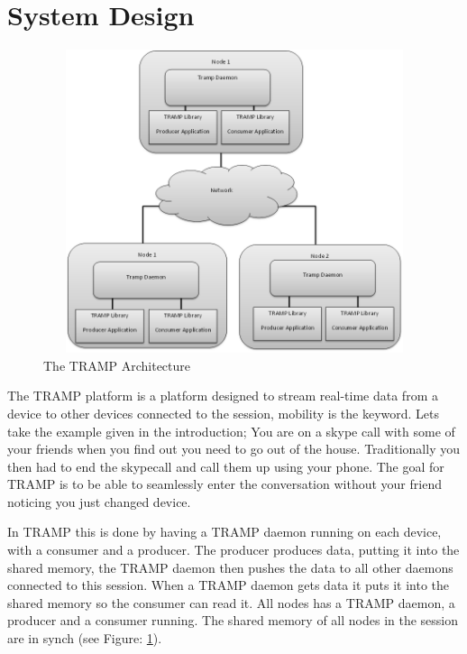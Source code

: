 \section{System Design}
\label{sec:design}

\begin{center}
\begin{figure}[ht!]
 \centering
 \includegraphics[width=6.0in, height=3.5in]{tramp_arch2.png}
\caption{The TRAMP Architecture}
\label{tramparc}
\end{figure}
\end{center}

The TRAMP platform is a platform designed to stream real-time data from a device to other devices connected to the session, mobility is the keyword. Lets take the example given in the introduction; You are on a skype call with some of your friends when you find out you need to go out of the house. Traditionally you then had to end the skypecall and call them up using your phone. The goal for TRAMP is to be able to seamlessly enter the conversation without your friend noticing you just changed device.

In TRAMP this is done by having a TRAMP daemon running on each device, with a consumer and a producer. The producer produces data, putting it into the shared memory, the TRAMP daemon then pushes the data to all other daemons connected to this session. When a TRAMP daemon gets data it puts it into the shared memory so the consumer can read it. All nodes has a TRAMP daemon, a producer and a consumer running. The shared memory of all nodes in the session are in synch (see Figure: \ref{tramparc}).

